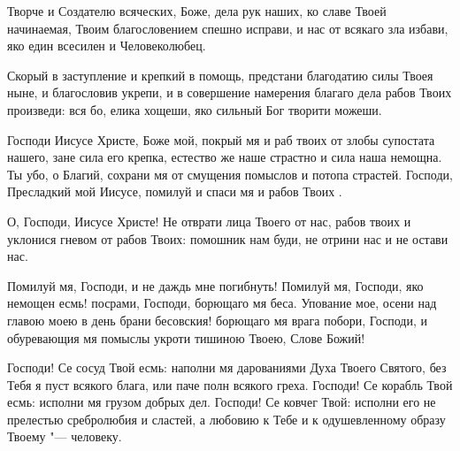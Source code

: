 

\label{_content_razlichnie_molitvi}



\begin{mymulticols}





Творче и Создателю всяческих, Боже, дела рук наших, ко славе Твоей начинаемая, Твоим благословением спешно исправи, и нас от всякаго зла избави, яко един всесилен и Человеколюбец.




Скорый в заступление и крепкий в помощь, предстани благодатию силы Твоея ныне, и благословив укрепи, и в совершение намерения благаго дела рабов Твоих произведи: вся бо, елика хощеши, яко сильный Бог творити можеши.

\end{mymulticols}

\mychapterending


\begin{mymulticols}





Господи Иисусе Христе, Боже мой, покрый мя и раб твоих  от злобы супостата нашего, зане сила его крепка, естество же наше страстно и сила наша немощна. Ты убо, о Благий, сохрани мя от смущения помыслов и потопа страстей. Господи, Пресладкий мой Иисусе, помилуй и спаси мя и рабов Твоих .




О, Господи, Иисусе Христе! Не отврати лица Твоего от нас, рабов твоих  и уклонися гневом от рабов Твоих: помошник нам буди, не отрини нас и не остави нас.




Помилуй мя, Господи, и не даждь мне погибнуть! Помилуй мя, Господи, яко немощен есмь! посрами, Господи, борющаго мя беса. Упование мое, осени над главою моею в день брани бесовския! борющаго мя врага побори, Господи, и обуревающия мя помыслы укроти тишиною Твоею, Слове Божий!




Господи! Се сосуд Твой есмь: наполни мя дарованиями Духа Твоего Святого, без Тебя я пуст всякого блага, или паче полн всякого греха. Господи! Се корабль Твой есмь: исполни мя грузом добрых дел. Господи! Се ковчег Твой: исполни его не прелестью сребролюбия и сластей, а любовию к Тебе и к одушевленному образу Твоему "--- человеку.


\end{mymulticols}

